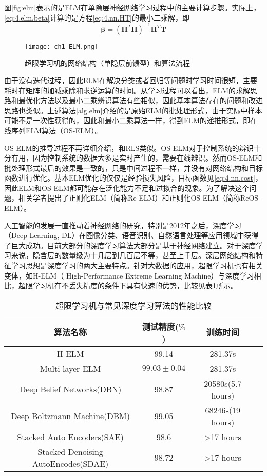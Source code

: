 图\eqref{fig:elm}表示的是ELM在单隐层神经网络学习过程中的主要计算步骤。实际上，\eqref{eq:4.elm.beta}计算的是方程\eqref{eq:4.nn.HT}的最小二乘解，即
\begin{equation}
\bm{\beta}=(\bm{H}^{T}\bm{H})^{-1}\bm{H}^{T}\bm{T} 
\end{equation}

\begin{figure}
 \centering
 \texttt{[image: ch1-ELM.png]}
 \caption{超限学习机的网络结构（单隐层前馈型）和算法流程}\label{fig:elm}
\end{figure}

由于没有迭代过程，因此ELM在解决分类或者回归等问题时学习时间很短，主要耗时在矩阵的加减乘除和求逆运算的时间。从学习过程可以看出，ELM的求解思路和最优化方法以及最小二乘辨识算法有些相似，因此基本算法存在的问题和改进思路也类似。上述算法\ref{alg.elm}介绍的是原始ELM的批处理形式，由于实际中样本可能不是一次性获得的，因此和最小二乘算法一样，得到ELM的递推形式，即在线序列ELM算法（OS-ELM）。

OS-ELM的推导过程不再详细介绍，和RLS类似。OS-ELM对于控制系统的辨识十分有用，因为控制系统的数据大多是实时产生的，需要在线辨识。然而OS-ELM和批处理形式最后的效果是一致的，只是中间过程不一样，并没有对网络结构和目标函数进行优化。基本ELM优化的仅仅是经验损失风险，目标函数见\eqref{eq:4.nn.cost}，因此ELM和OS-ELM都可能存在泛化能力不足和过拟合的现象。为了解决这个问题，相关学者提出了正则化ELM（简称Re-ELM）和正则化OS-ELM（简称ReOS-ELM）。

人工智能的发展一直推动着神经网络的研究，特别是2012年之后，深度学习（Deep Learning, DL）在图像分类、语音识别、自然语言处理等应用领域中获得了巨大成功。目前大部分的深度学习算法大部分是基于神经网络建立。对于深度学习来说，隐含层的数量级为十几层到几百层不等，甚至上千层。深层网络结构和特征学习思想是深度学习的两大主要特点。针对大数据的应用，超限学习机也有相关变体，如H-ELM（
High-Performance Extreme Learning Machine）与深度学习相比，超限学习机在不丢失精度的条件下具有快速的优势，比较见表\ref{tab:elm-dl}所示。
\begin{table}
\centering
\caption{超限学习机与常见深度学习算法的性能比较}\label{tab:elm-dl}
\begin{tabular*}{0.9\textwidth}{@{\extracolsep{\fill}}cccc}
\toprule
算法名称	&测试精度($\%$)	&训练时间 \\
\midrule
H-ELM	&99.14	&281.37s\\
Multi-layer ELM	&$99.03\pm0.04$	&281.37s\\
Deep Belief Networks(DBN)	&98.87	&20580s(5.7 hours)\\
Deep Boltzmann Machine(DBM)	&99.05	&68246s(19 hours)\\
Stacked Auto Encoders(SAE)	&98.6	&>17 hours\\
Stacked Denoising AutoEncodes(SDAE)	&98.72	&>17 hours\\
\bottomrule
\end{tabular*}
\end{table}

